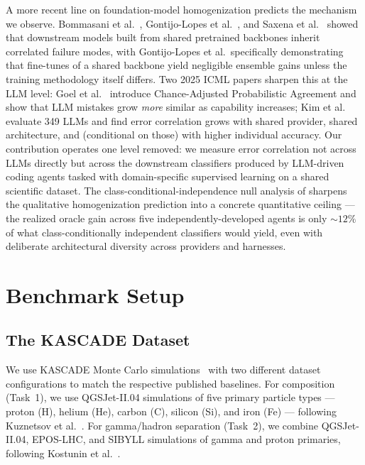 \documentclass[universe,article,submit,pdftex,oneauthor]{Definitions/mdpi}
\begin{document}
A more recent line on foundation-model homogenization predicts the mechanism we observe. Bommasani et al.~\cite{bommasani_picking}, Gontijo-Lopes et al.~\cite{gontijo_lopes}, and Saxena et al.~\cite{saxena_agreement} showed that downstream models built from shared pretrained backbones inherit correlated failure modes, with Gontijo-Lopes et al.\ specifically demonstrating that fine-tunes of a shared backbone yield negligible ensemble gains unless the training methodology itself differs. Two 2025 ICML papers sharpen this at the LLM level: Goel et al.~\cite{goel_think_alike} introduce Chance-Adjusted Probabilistic Agreement and show that LLM mistakes grow \emph{more} similar as capability increases; Kim et al.~\cite{kim_correlated} evaluate 349 LLMs and find error correlation grows with shared provider, shared architecture, and (conditional on those) with higher individual accuracy. Our contribution operates one level removed: we measure error correlation not across LLMs directly but across the downstream classifiers produced by LLM-driven coding agents tasked with domain-specific supervised learning on a shared scientific dataset. The class-conditional-independence null analysis of  sharpens the qualitative homogenization prediction into a concrete quantitative ceiling --- the realized oracle gain across five independently-developed agents is only ${\sim}12\%$ of what class-conditionally independent classifiers would yield, even with deliberate architectural diversity across providers and harnesses.


\section{Benchmark Setup}
\label{sec:data}

\subsection{The KASCADE Dataset}

We use KASCADE Monte Carlo simulations~\cite{kcdc_sim_manual} with two different dataset configurations to match the respective published baselines. For composition (Task~1), we use QGSJet-II.04 simulations of five primary particle types --- proton (H), helium (He), carbon (C), silicon (Si), and iron (Fe) --- following Kuznetsov et al.~\cite{kascade_jinst}. For gamma/hadron separation (Task~2), we combine QGSJet-II.04, EPOS-LHC, and SIBYLL simulations of gamma and proton primaries, following Kostunin et al.~\cite{kascade_icrc}.
\end{document}

